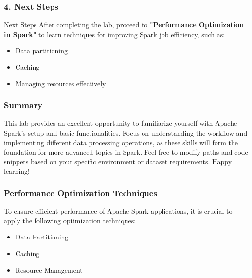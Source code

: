 \documentclass{beamer}
\begin{document}
\begin{frame}
    \frametitle{4. Next Steps}
    \begin{block}{Next Steps}
        After completing the lab, proceed to \textbf{"Performance Optimization in Spark"} to learn techniques for improving Spark job efficiency, such as:
        \begin{itemize}
            \item Data partitioning
            \item Caching
            \item Managing resources effectively
        \end{itemize}
    \end{block}
\end{frame}

\begin{frame}
    \frametitle{Summary}
    This lab provides an excellent opportunity to familiarize yourself with Apache Spark's setup and basic functionalities. 
    Focus on understanding the workflow and implementing different data processing operations, as these skills will form the foundation for more advanced topics in Spark. 
    Feel free to modify paths and code snippets based on your specific environment or dataset requirements. Happy learning!
\end{frame}

\begin{frame}
    \titlepage
\end{frame}

\begin{frame}
    \frametitle{Performance Optimization Techniques}
    To ensure efficient performance of Apache Spark applications, it is crucial to apply the following optimization techniques:
    
    \begin{itemize}
        \item Data Partitioning
        \item Caching
        \item Resource Management
    \end{itemize}
\end{frame}
\end{document}
